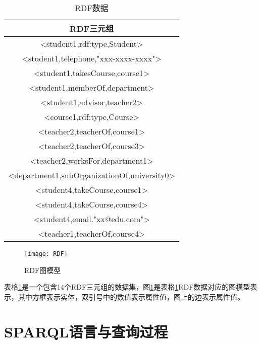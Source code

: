 \begin{table}[htbp]
    \caption[table1]{RDF数据}
    \label{RDF1}
    \vspace{0.5em}\centering\wuhao
    \begin{tabular}{|c|}
    \toprule[1.5pt]
    RDF三元组\\
    \midrule[1pt]    
    <student1,rdf:type,Student>\\
    <student1,telephone,"xxx-xxxx-xxxx">\\
    <student1,takesCourse,course1>\\
    <student1,memberOf,department>\\
    <student1,advisor,teacher2>\\
    <course1,rdf:type,Course>\\
    <teacher2,teacherOf,course1>\\
    <teacher2,teacherOf,course3>\\
    <teacher2,worksFor,department1>\\
    <department1,subOrganizationOf,university0>\\
    <student4,takeCourse,course1>\\
    <student4,takeCourse,course4>\\
    <student4,email."xx@edu.com">\\
    <teacher1,teacherOf,course4>\\
    \bottomrule[1.5pt]
    \end{tabular}
\end{table}

\begin{figure}[h]
    \centering
    \texttt{[image: RDF]}
    \caption{RDF图模型}
    \label{RDFPhoto}
\end{figure}

表格\ref{RDF1}是一个包含14个RDF三元组的数据集，图\ref{RDFPhoto}是表格\ref{RDF1}RDF数据对应的图模型表示，其中方框表示实体，双引号中的数值表示属性值，图上的边表示属性值。


\section{SPARQL语言与查询过程}

